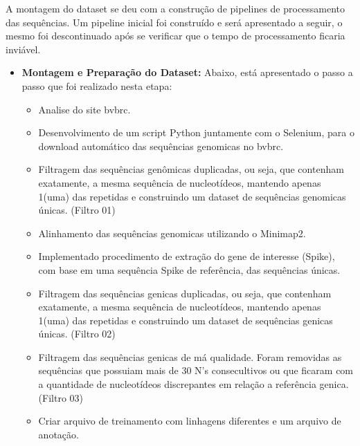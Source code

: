 A montagem do dataset se deu com a construção de pipelines de processamento das sequências. Um pipeline inicial foi construído e será apresentado a seguir, o mesmo foi descontinuado após se verificar que o tempo de processamento ficaria inviável.

\begin{itemize}
  \item \textbf{Montagem e Preparação do Dataset:}  Abaixo, está apresentado o passo a passo que foi realizado nesta etapa:
        \begin{itemize}
          \item Analise do site \gls{bvbrc}.
          \item Desenvolvimento de um script Python juntamente com o Selenium, para o download automático das sequências genomicas no \gls{bvbrc}.
          \item Filtragem das sequências genômicas duplicadas, ou seja, que contenham exatamente, a mesma sequência de nucleotídeos, mantendo apenas 1(uma) das repetidas e construindo um dataset de sequências genomicas únicas. (Filtro 01)
          \item Alinhamento das sequências genomicas utilizando o Minimap2.
          \item Implementado procedimento de extração do gene de interesse (Spike), com base em uma sequência Spike de referência, das sequências únicas.
          \item Filtragem das sequências genicas duplicadas, ou seja, que contenham exatamente, a mesma sequência de nucleotídeos, mantendo apenas 1(uma) das repetidas e construindo um dataset de sequências genicas únicas. (Filtro 02)
          \item Filtragem das sequências genicas de má qualidade. Foram removidas as sequências que possuiam mais de 30 N's consecultivos ou que ficaram com a quantidade de nucleotídeos discrepantes em relação a referência genica. (Filtro 03)
          \item Criar arquivo de treinamento com linhagens diferentes e um arquivo de anotação. %
        \end{itemize}



\end{itemize}
